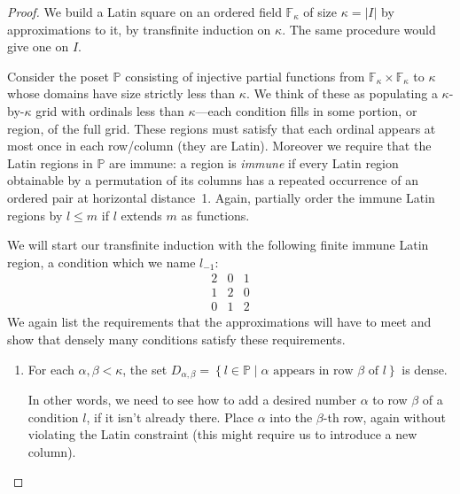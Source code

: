 \documentclass[12pt,a4paper]{article}
\newcommand{\F}{\mathbb{F}}
\newcommand{\st}{\; | \;}
\newcommand{\set}[2]{\left\{#1\st #2 \right\}}
\renewcommand{\P}{\mathbb{P}}
\begin{document}
\begin{proof}
We build a Latin square on an ordered field $\F_\kappa$ of size $\kappa=|I|$ by approximations to it, by transfinite induction on $\kappa$. The same procedure would give one on $I$.

Consider the poset $\P$ consisting of injective partial functions from $\F_\kappa\times\F_\kappa$ to $\kappa$ whose domains have size strictly less than $\kappa$. We think of these as populating a $\kappa$-by-$\kappa$ grid with ordinals less than $\kappa$---each condition fills in some portion, or region, of the full grid. These regions must satisfy that each ordinal appears at most once in each row/column (they are Latin). Moreover we require that the Latin regions in $\P$ are immune: a region is \textit{immune} if every Latin region  obtainable by a permutation of its columns has a repeated occurrence of an ordered pair at horizontal distance~1. Again, partially order the immune Latin regions by $l\leq m$ if $l$ extends $m$ as functions.

We will start our transfinite induction with the following finite immune Latin region, a condition which we name $l_{-1}$:
$$
\begin{array}{ccc}
2  & 0 & 1 \\ 
1 & 2 &  0  \\
 0  & 1 & 2 
\end{array}
$$
We again list the requirements that the approximations will have to meet and show that densely many conditions satisfy these requirements.
\begin{enumerate}
	\item For each $\alpha, \beta<\kappa$, the set $D_{\alpha,\beta}=\set{l \in \P}{\alpha \text{ appears in row } \beta \text{ of } l}$ is dense.
	
	In other words, we need to see how to add a desired number $\alpha$ to row $\beta$ of a condition $l$, if it isn't already there. Place $\alpha$ into the $\beta$-th row, again without violating the Latin constraint (this might require us to introduce a new column).
	

\end{enumerate}
\end{proof}
\end{document}
